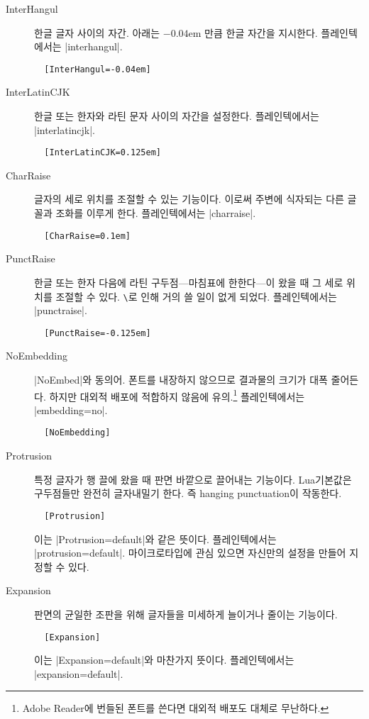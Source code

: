 \documentclass[a4paper]{article}
\def\cs#1{\texttt{\color{MidnightBlue}\textbackslash\detokenize{#1}}}
\begin{document}
\begin{description}
  \item[InterHangul] {한글 글자
    사이의 자간}.  아래는 $-0.04$em 만큼 한글
  자간을 지시한다. 플레인텍에서는 |interhangul|.
\begin{verbatim}
  [InterHangul=-0.04em]
\end{verbatim}

\item[InterLatinCJK] 한글 또는 한자와 라틴 문자 사이의 자간을
  설정한다. 플레인텍에서는 |interlatincjk|.
\begin{verbatim}
  [InterLatinCJK=0.125em]
\end{verbatim}

\item[CharRaise] 글자의 세로 위치를
  { 조절}할 수 있는 기능이다.
  이로써 주변에 식자되는 다른 글꼴과 조화를 이루게 한다.
  플레인텍에서는 |charraise|.
\begin{verbatim}
  [CharRaise=0.1em]
\end{verbatim}

\item[PunctRaise] 한글 또는 한자 다음에 라틴 구두점---마침표에
  한한다---이 왔을 때 그 세로 위치를 조절할 수 있다.
  \cs{hangulpunctuations}로 인해 거의 쓸 일이 없게 되었다.
  플레인텍에서는 |punctraise|.
\begin{verbatim}
  [PunctRaise=-0.125em]
\end{verbatim}

\item[NoEmbedding] |NoEmbed|와 동의어.
  폰트를 내장하지 않으므로 결과물의 크기가 대폭 줄어든다.
  하지만 대외적 배포에 적합하지 않음에 유의.\footnote{%
    Adobe Reader에 번들된 폰트를 쓴다면 대외적 배포도 대체로 무난하다.}
  플레인텍에서는 |embedding=no|.
\begin{verbatim}
  [NoEmbedding]
\end{verbatim}

\item[Protrusion] 특정 글자가 행 끌에 왔을 때 판면 바깥으로 끌어내는
  기능이다.  Lua 기본값은 구두점들만 완전히 글자내밀기 한다. 즉
  hanging punctuation이 작동한다.
\begin{verbatim}
  [Protrusion]
\end{verbatim}
  이는 |Protrusion=default|와 같은 뜻이다.
  플레인텍에서는 |protrusion=default|.
  마이크로타입에 관심 있으면 자신만의 설정을 만들어 지정할 수 있다.

\item[Expansion] 판면의 균일한 조판을 위해 글자들을 미세하게 늘이거나
  줄이는 기능이다.
\begin{verbatim}
  [Expansion]
\end{verbatim}
  이는 |Expansion=default|와 마찬가지 뜻이다.
  플레인텍에서는 |expansion=default|.

\end{description}
\end{document}
